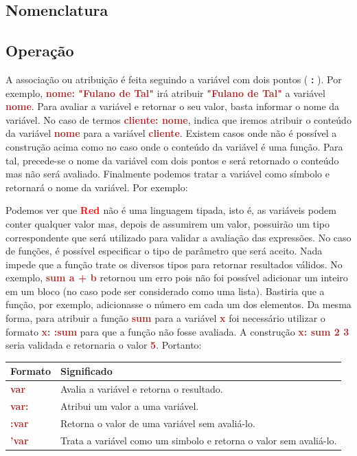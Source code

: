 \documentclass[12pt,a4paper]{article}
\newcommand{\incss}[1]{
  \ttfamily\small
  \begin{shaded}
    \VerbatimInput{./fragmentos/#1.ss}
  \end{shaded}
  \normalfont
}
\newcommand{\Red}{\textbf{\textcolor{red}{Red }}}
\newcommand{\codigo}[1]{\ttfamily\small\textcolor{Brown}{\textbf{#1}}\normalfont}
\begin{document}
\subsection{Nomenclatura}

\subsection{Operação}

A associação ou atribuição é feita seguindo a variável com dois pontos (
\textbf{:} ). Por exemplo, \codigo{nome: "Fulano de Tal"} irá atribuir
\codigo{"Fulano de Tal"} a variável \codigo{nome}. Para avaliar a variável e
retornar o seu valor, basta informar o nome da variável. No caso de termos 
\codigo{cliente: nome}, indica que iremos atribuir o conteúdo da variável
\codigo{nome} para a variável \codigo{cliente}. Existem casos onde não é
possível a construção acima como no caso onde o conteúdo da variável é uma
função. Para tal, precede-se o nome da variável com dois pontos e será retornado
o conteúdo mas não será avaliado. Finalmente podemos tratar a variável como
símbolo e retornará o nome da variável. Por exemplo: 

\incss{repl-var}

Podemos ver que \Red não é uma linguagem tipada, isto é, as variáveis podem
conter qualquer valor mas, depois de assumirem um valor, possuirão um tipo
correspondente que será utilizado para validar a avaliação das expressões. No
caso de funções, é possível especificar o tipo de parâmetro que será aceito.
Nada impede que a função trate os diversos tipos para retornar resultados
válidos. No exemplo, \codigo{sum a + b} retornou um erro pois não foi possível
adicionar um inteiro em um bloco (no caso pode ser considerado como uma lista).
Bastiria que a função, por exemplo, adicionasse o número em cada um dos
elementos. Da mesma forma, para atribuir a função \codigo{sum} para a variável
\codigo{x} foi necessário utilizar o formato \codigo{x: :sum} para que a função
não fosse avaliada. A construção \codigo{x: sum 2 3} seria validada e retornaria
o valor \codigo{5}. Portanto:

\begin{center}
\begin{tabular}{|l|l|}
\hline
\textbf{Formato} & \textbf{Significado} \\
\hline
\hline
\codigo{var} & Avalia a variável e retorna o resultado. \\
\hline
\codigo{var:} & Atribui um valor a uma variável. \\
\hline
\codigo{:var} & Retorna o valor de uma variável sem avaliá-lo.\\
\hline
\codigo{'var} & Trata a variável como um simbolo e retorna o valor sem avaliá-lo.\\
\hline
\end{tabular}
\end{center}
\end{document}

